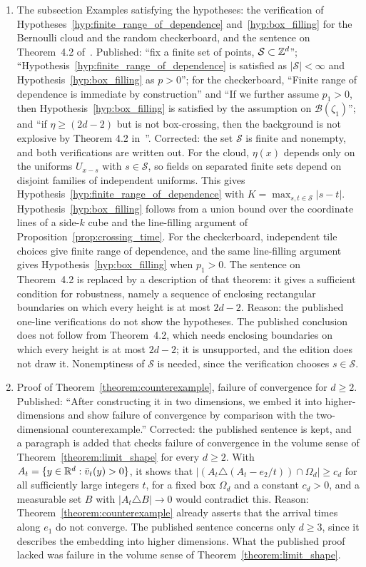 \documentclass[12pt]{amsart}
\begin{document}
\begin{enumerate}
\item[C15.] The subsection Examples satisfying the hypotheses: the verification of Hypotheses~\ref{hyp:finite_range_of_dependence} and~\ref{hyp:box_filling} for the Bernoulli cloud and the random checkerboard, and the sentence on Theorem~4.2 of~\cite{fey2010growth}. Published: ``fix a finite set of points, $\mathcal S\subset\mathbb{Z}^d$''; ``Hypothesis~\ref{hyp:finite_range_of_dependence} is satisfied as $|\mathcal S|<\infty$ and Hypothesis~\ref{hyp:box_filling} as $p>0$''; for the checkerboard, ``Finite range of dependence is immediate by construction'' and ``If we further assume $p_1>0$, then Hypothesis~\ref{hyp:box_filling} is satisfied by the assumption on $\mathcal B(\zeta_1)$''; and ``if $\eta\geq(2d-2)$ but is not box-crossing, then the background is not explosive by Theorem 4.2 in~\cite{fey2010growth}''. Corrected: the set $\mathcal S$ is finite and nonempty, and both verifications are written out. For the cloud, $\eta(x)$ depends only on the uniforms $U_{x-s}$ with $s\in\mathcal S$, so fields on separated finite sets depend on disjoint families of independent uniforms. This gives Hypothesis~\ref{hyp:finite_range_of_dependence} with $K=\max_{s,t\in\mathcal S}|s-t|$. Hypothesis~\ref{hyp:box_filling} follows from a union bound over the coordinate lines of a side-$k$ cube and the line-filling argument of Proposition~\ref{prop:crossing_time}. For the checkerboard, independent tile choices give finite range of dependence, and the same line-filling argument gives Hypothesis~\ref{hyp:box_filling} when $p_1>0$. The sentence on Theorem~4.2 is replaced by a description of that theorem: it gives a sufficient condition for robustness, namely a sequence of enclosing rectangular boundaries on which every height is at most $2d-2$. Reason: the published one-line verifications do not show the hypotheses. The published conclusion does not follow from Theorem~4.2, which needs enclosing boundaries on which every height is at most $2d-2$; it is unsupported, and the edition does not draw it. Nonemptiness of $\mathcal S$ is needed, since the verification chooses $s\in\mathcal S$.
\item[C16.] Proof of Theorem~\ref{theorem:counterexample}, failure of convergence for $d\geq2$. Published: ``After constructing it in two dimensions, we embed it into higher-dimensions and show failure of convergence by comparison with the two-dimensional counterexample.'' Corrected: the published sentence is kept, and a paragraph is added that checks failure of convergence in the volume sense of Theorem~\ref{theorem:limit_shape} for every $d\geq2$. With $A_t=\{y\in\mathbb{R}^d:\bar v_t(y)>0\}$, it shows that $|(A_t\triangle(A_t-e_2/t))\cap\Omega_d|\geq c_d$ for all sufficiently large integers $t$, for a fixed box $\Omega_d$ and a constant $c_d>0$, and a measurable set $B$ with $|A_t\triangle B|\to0$ would contradict this. Reason: Theorem~\ref{theorem:counterexample} already asserts that the arrival times along $e_1$ do not converge. The published sentence concerns only $d\geq3$, since it describes the embedding into higher dimensions. What the published proof lacked was failure in the volume sense of Theorem~\ref{theorem:limit_shape}.

\end{enumerate}
\end{document}
